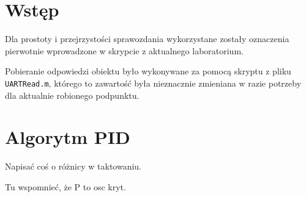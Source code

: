 \chapter{Wstęp}
Dla prostoty i przejrzystości sprawozdania wykorzystane zostały oznaczenia pierwotnie wprowadzone w skrypcie z aktualnego laboratorium\@.

Pobieranie odpowiedzi obiektu było wykonywane za pomocą skryptu z pliku \verb|UARTRead.m|, którego to zawartość była nieznacznie zmieniana w razie potrzeby dla aktualnie robionego podpunktu.

\chapter{Algorytm PID}


Napisać coś o różnicy w taktowaniu.
\begin{figure}[H]
\centering

\end{figure}

\begin{figure}[H]
\centering

\end{figure}

Tu wspomnieć, że P to osc kryt.
\begin{figure}[H]
\centering

\end{figure}

\begin{figure}[H]
\centering

\end{figure}

\begin{figure}[H]
\centering

\end{figure}

\begin{figure}[H]
\centering

\end{figure}

\begin{figure}[H]
\centering

\end{figure}


\begin{figure}[H]
\centering

\end{figure}

\begin{figure}[H]
\centering

\end{figure}

